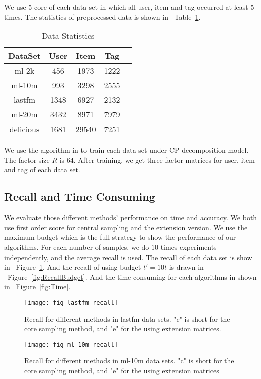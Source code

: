 \documentclass[letterpaper]{article}
\newcommand{\Fig}[1]   {Figure~\ref{fig:#1}}
\newcommand{\Table}[1] {Table~\ref{table:#1}}
\begin{document}
We use 5-core of each data set in which all user, item and tag occurred at least 5 times.
The statistics of preprocessed data is shown in ~\Table{Data}.
\begin{table}[ht]
  \label{table:Data}
  \centering
  \begin{tabular}{|c|c|c|c|c|}
    \hline
    DataSet & User & Item & Tag \\
    \hline
    ml-2k       & 456  &  1973   &  1222  \\
    ml-10m      & 993  &  3298   &  2555  \\
    lastfm      & 1348 &  6927   &  2132  \\
    ml-20m      & 3432 &  8971   &  7979  \\
    delicious   & 1681 &  29540  &  7251  \\
    \hline
  \end{tabular}
  \caption{Data Statistics}
\end{table}
We use the algorithm in \cite{Rendle_RTF} to train each data set under CP decomposition model.
The factor size $R$ is $64$.
After training, we get three factor matrices for user, item and tag of each data set.

\subsection{Recall and Time Consuming}
We evaluate those different methods' performance on time and accuracy. We both use first order score for central sampling and the extension version.
We use the maximum budget which is the full-strategy to show the performance of our algorithms.
For each number of samples, we do $10$ times experiments independently, and the average recall is used.
The recall of each data set is show in ~\Fig{lastfm_recall}. 
And the recall of using budget $t'=10t$ is drawn in ~\Fig{RecallBudget}. And the time consuming for each algorithms in shown in ~\Fig{Time}.
\begin{figure}[ht]
  \centering
  \texttt{[image: fig\_lastfm\_recall]}\\
  \caption{Recall for different methods in lastfm data sets. "c" is short for the core sampling method, and "e" for the using extension matrices.}
  \label{fig:lastfm_recall}
\end{figure}

\begin{figure}[ht]
  \centering
  \texttt{[image: fig\_ml\_10m\_recall]}\\
  \caption{Recall for different methods in ml-10m data sets. "c" is short for the core sampling method, and "e" for the using extension matrices}
  \label{fig:ml_10m_recall}
\end{figure}
\end{document}
